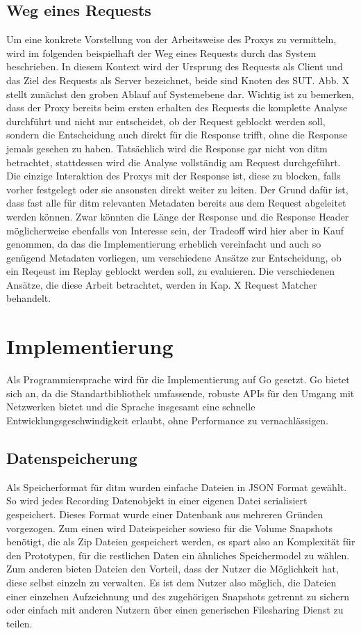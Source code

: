 \documentclass[12pt,a4paper]{report}
\begin{document}
\subsection{Weg eines Requests}
Um eine konkrete Vorstellung von der Arbeitsweise des Proxys zu vermitteln, wird im folgenden beispielhaft der Weg eines
Requests durch das System beschrieben. In diesem Kontext wird der Ursprung des Requests als Client und das Ziel des
Requests als Server bezeichnet, beide sind Knoten des SUT. Abb. X stellt zunächst den groben Ablauf auf Systemebene dar.
Wichtig ist zu bemerken, dass der Proxy bereits beim ersten erhalten des Requests die komplette Analyse durchführt und
nicht nur entscheidet, ob der Request geblockt werden soll, sondern die Entscheidung auch direkt für die Response trifft,
ohne die Response jemals gesehen zu haben. Tatsächlich wird die Response gar nicht von ditm betrachtet, stattdessen wird
die Analyse vollständig am Request durchgeführt. Die einzige Interaktion des Proxys mit der Response ist, diese zu blocken,
falls vorher festgelegt oder sie ansonsten direkt weiter zu leiten.
Der Grund dafür ist, dass fast alle für ditm relevanten Metadaten bereits aus dem Request abgeleitet werden können. Zwar
könnten die Länge der Response und die Response Header möglicherweise ebenfalls von Interesse sein, der Tradeoff wird
hier aber in Kauf genommen, da das die Implementierung erheblich vereinfacht und auch so genügend Metadaten vorliegen,
um verschiedene Ansätze zur Entscheidung, ob ein Reqeust im Replay geblockt werden soll, zu evaluieren.
Die verschiedenen Ansätze, die diese Arbeit betrachtet, werden in Kap. X Request Matcher behandelt.

\section{Implementierung}
Als Programmiersprache wird für die Implementierung auf Go gesetzt. Go bietet sich an, da die Standartbibliothek
umfassende, robuste APIs für den Umgang mit Netzwerken bietet und die Sprache insgesamt eine schnelle
Entwicklungsgeschwindigkeit erlaubt, ohne Performance zu vernachlässigen.
\subsection{Datenspeicherung}
Als Speicherformat für ditm wurden einfache Dateien in JSON Format gewählt. So wird jedes Recording Datenobjekt in
einer eigenen Datei serialisiert gespeichert. Dieses Format wurde einer Datenbank aus mehreren Gründen vorgezogen.
Zum einen wird Dateispeicher sowieso für die Volume Snapshots benötigt, die als Zip Dateien gespeichert werden,
es spart also an Komplexität für den Prototypen, für die restlichen Daten ein ähnliches Speichermodel zu wählen.
Zum anderen bieten Dateien den Vorteil, dass der Nutzer die Möglichkeit hat, diese selbst einzeln zu verwalten.
Es ist dem Nutzer also möglich, die Dateien einer einzelnen Aufzeichnung und des zugehörigen Snapshots getrennt
zu sichern oder einfach mit anderen Nutzern über einen generischen Filesharing Dienst zu teilen.
\end{document}
